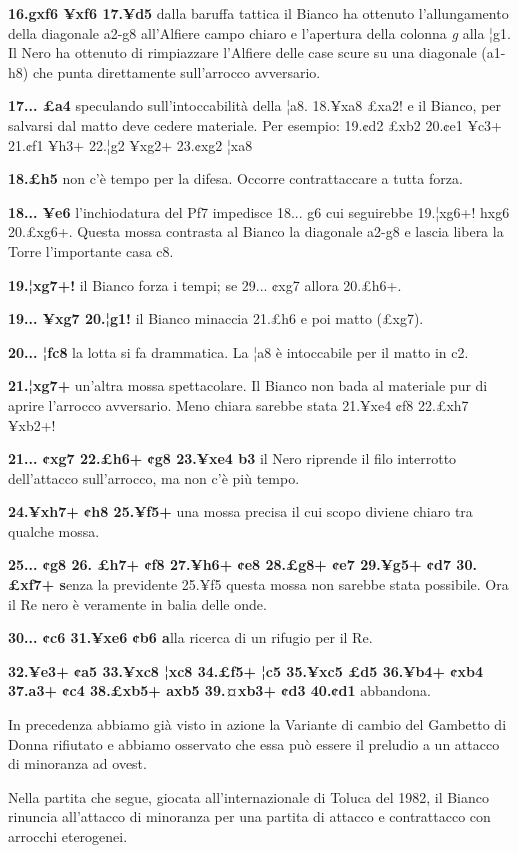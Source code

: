 \textbf{16.gxf6 ¥xf6 17.¥d5} dalla baruffa tattica il Bianco ha ottenuto
l'allungamento della diagonale a2-g8 all'Alfiere campo chiaro e
l'apertura della colonna \emph{g} alla ¦g1. Il Nero ha ottenuto di
rimpiazzare l'Alfiere delle case scure su una diagonale (a1-h8) che
punta direttamente sull'arrocco avversario.

\textbf{17... £a4} speculando sull'intoccabilità della ¦a8. 18.¥xa8
£xa2! e il Bianco, per salvarsi dal matto deve cedere materiale. Per
esempio: 19.¢d2 £xb2 20.¢e1 ¥c3+ 21.¢f1 ¥h3+ 22.¦g2 ¥xg2+ 23.¢xg2 ¦xa8

\textbf{18.£h5} non c'è tempo per la difesa. Occorre contrattaccare a
tutta forza.

\textbf{18... ¥e6} l'inchiodatura del Pf7 impedisce 18... g6 cui
seguirebbe 19.¦xg6+! hxg6 20.£xg6+. Questa mossa contrasta al Bianco la
diagonale a2-g8 e lascia libera la Torre l'importante casa c8.

\textbf{19.¦xg7+!} il Bianco forza i tempi; se 29... ¢xg7 allora
20.£h6+.

\textbf{19... ¥xg7 20.¦g1!} il Bianco minaccia 21.£h6 e poi matto
(£xg7).

\textbf{20... ¦fc8} la lotta si fa drammatica. La ¦a8 è intoccabile per
il matto in c2.

\textbf{21.¦xg7+} un'altra mossa spettacolare. Il Bianco non bada al
materiale pur di aprire l'arrocco avversario. Meno chiara sarebbe stata
21.¥xe4 ¢f8 22.£xh7 ¥xb2+!

\textbf{21... ¢xg7 22.£h6+ ¢g8 23.¥xe4 b3} il Nero riprende il filo
interrotto dell'attacco sull'arrocco, ma non c'è più tempo.

\textbf{24.¥xh7+ ¢h8 25.¥f5+} una mossa precisa il cui scopo diviene
chiaro tra qualche mossa.

\textbf{25... ¢g8 26. £h7+ ¢f8 27.¥h6+ ¢e8 28.£g8+ ¢e7 29.¥g5+ ¢d7
30.£xf7+ s}enza la previdente 25.¥f5 questa mossa non sarebbe stata
possibile. Ora il Re nero è veramente in balia delle onde.

\textbf{30... ¢c6 31.¥xe6 ¢b6 a}lla ricerca di un rifugio per il Re.

\textbf{32.¥e3+ ¢a5 33.¥xc8 ¦xc8 34.£f5+ ¦c5 35.¥xc5 £d5 36.¥b4+ ¢xb4
37.a3+ ¢c4 38.£xb5+ axb5 39.¤xb3+ ¢d3 40.¢d1} abbandona.

In precedenza abbiamo già visto in azione la Variante di cambio del
Gambetto di Donna rifiutato e abbiamo osservato che essa può essere il
preludio a un attacco di minoranza ad ovest.

Nella partita che segue, giocata all'internazionale di Toluca del 1982,
il Bianco rinuncia all'attacco di minoranza per una partita di attacco e
contrattacco con arrocchi eterogenei.

